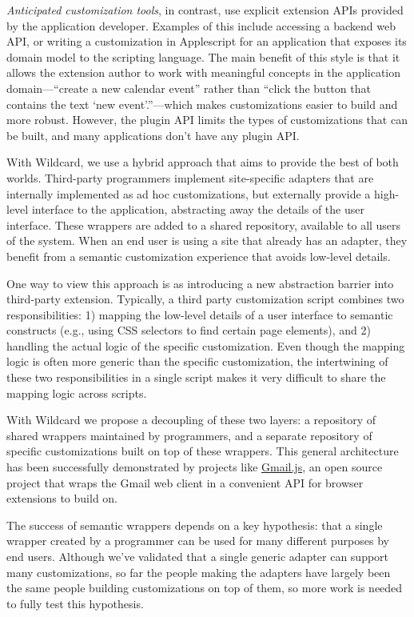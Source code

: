 \documentclass[sigplan,screen,10pt,anonymous,review]{acmart}
\begin{document}
\emph{Anticipated customization tools}, in contrast, use explicit
extension APIs provided by the application developer. Examples of this
include accessing a backend web API, or writing a customization in
Applescript for an application that exposes its domain model to the
scripting language. The main benefit of this style is that it allows the
extension author to work with meaningful concepts in the application
domain---``create a new calendar event'' rather than ``click the button
that contains the text `new event'.''---which makes customizations
easier to build and more robust. However, the plugin API limits the
types of customizations that can be built, and many applications don't
have any plugin API.

With Wildcard, we use a hybrid approach that aims to provide the best of
both worlds. Third-party programmers implement site-specific adapters
that are internally implemented as ad hoc customizations, but externally
provide a high-level interface to the application, abstracting away the
details of the user interface. These wrappers are added to a shared
repository, available to all users of the system. When an end user is
using a site that already has an adapter, they benefit from a semantic
customization experience that avoids low-level details.

One way to view this approach is as introducing a new abstraction
barrier into third-party extension. Typically, a third party
customization script combines two responsibilities: 1) mapping the
low-level details of a user interface to semantic constructs (e.g.,
using CSS selectors to find certain page elements), and 2) handling the
actual logic of the specific customization. Even though the mapping
logic is often more generic than the specific customization, the
intertwining of these two responsibilities in a single script makes it
very difficult to share the mapping logic across scripts.

With Wildcard we propose a decoupling of these two layers: a repository
of shared wrappers maintained by programmers, and a separate repository
of specific customizations built on top of these wrappers. This general
architecture has been successfully demonstrated by projects like
\href{https://github.com/KartikTalwar/gmail.js/}{Gmail.js}, an open
source project that wraps the Gmail web client in a convenient API for
browser extensions to build on.

The success of semantic wrappers depends on a key hypothesis: that a
single wrapper created by a programmer can be used for many different
purposes by end users. Although we've validated that a single generic
adapter can support many customizations, so far the people making the
adapters have largely been the same people building customizations on
top of them, so more work is needed to fully test this hypothesis.
\end{document}
